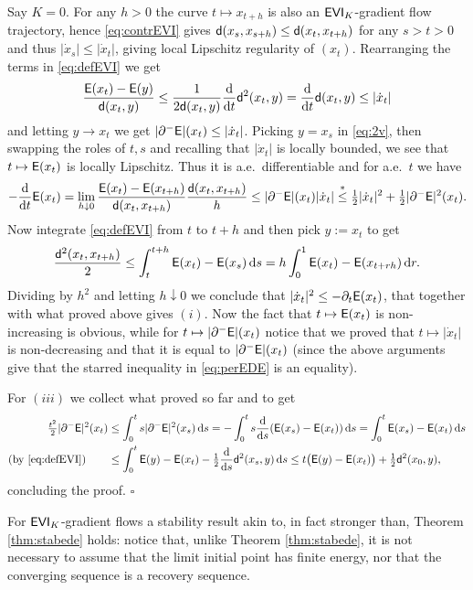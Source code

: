 \documentclass[11pt]{article}
\numberwithin{equation}{section}
\newenvironment{idea}{\removelastskip\par\medskip   %
\noindent{\em Idea of the proof} \rm}{\penalty-20\null\hfill$\square$\par\medbreak}
\newcommand{\sfd}{{\sf d}}
\renewcommand{\d}{{\rm d}}
\newcommand{\E}{{\sf E}} %
\newcommand{\EVI}{{\sf EVI}}
\begin{document}
\begin{idea} Say $K=0$. For any $h>0$ the curve $t\mapsto x_{t+h}$ is also an $\EVI_K$-gradient flow trajectory, hence \eqref{eq:contrEVI} gives $\sfd(x_s,x_{s+h})\leq\sfd(x_t,x_{t+h})$ for any $s>t>0$ and thus $|\dot x_s|\leq |\dot x_t|$, giving local Lipschitz regularity of $(x_t)$. Rearranging the terms in  \eqref{eq:defEVI} we get
\begin{equation}
\label{eq:2v}
\frac{\E(x_t)-\E(y)}{\sfd(x_t,y)}\leq\frac1{2\sfd(x_t,y)}\frac\d{\d t}\sfd^2(x_t,y)=\frac\d{\d t}\sfd(x_t,y)\leq|\dot x_t|
\end{equation}
and letting $y\to x_t$ we get $|\partial^-\E|(x_t)\leq|\dot x_t|$. Picking $y=x_s$ in \eqref{eq:2v}, then swapping the roles of $t,s$ and recalling that $|\dot x_t|$ is locally bounded, we see that $t\mapsto \E(x_t)$ is locally Lipschitz. Thus it is a.e.\ differentiable and for a.e.\ $t$ we have
\begin{equation}
\label{eq:perEDE}
-\frac\d{\d t}\E(x_t)=\lim_{h\downarrow0}\frac{\E(x_t)-\E(x_{t+h})}{\sfd(x_t,x_{t+h})}\frac{\sfd(x_t,x_{t+h})}h\leq |\partial^-\E|(x_t)|\dot x_t|\stackrel*\leq\tfrac12|\dot x_t|^2+\tfrac12|\partial^-\E|^2(x_t).
\end{equation}
Now integrate \eqref{eq:defEVI} from $t$ to $t+h$ and then pick $y:=x_{t}$ to get 
\[
\frac{\sfd^2(x_t,x_{t+h})}2\leq \int_t^{t+h}\E(x_{t})-\E(x_{s})\,\d s=h\int_0^1\E(x_t)-\E(x_{t+rh})\,\d r.
\]
Dividing by $h^2$ and letting $h\downarrow0$ we conclude that $|\dot x_t|^2\leq -\partial_t\E(x_t)$, that together with what proved above gives $(i)$. Now the fact that $ t\mapsto \E(x_t)$ is non-increasing is obvious, while for $ t\mapsto |\partial^-\E|(x_t)$  notice that we proved that  $t\mapsto |\dot x_t|$ is non-decreasing and that it is equal to $|\partial^-\E|(x_t)$ (since the above arguments give that the starred inequality in \eqref{eq:perEDE} is an equality).

For $(iii)$ we collect what proved so far and to get
\[
\begin{split}
\tfrac{t^2}2|\partial^-\E|^2(x_t)&\leq\int_0^ts|\partial^-\E|^2(x_s)\,\d s=-\int_0^ts\frac\d{\d s}(\E(x_s)-\E(x_t))\,\d s=\int_0^t\E(x_s)-\E(x_t)\,\d s\\
\text{(by \eqref{eq:defEVI})}\qquad&\leq \int_0^t\E(y)-\E(x_t)-\tfrac12\frac\d{\d s}\sfd^2(x_s,y)\,\d s\leq t\big(\E(y)-\E(x_t)\big)+\tfrac12\sfd^2(x_0,y),
\end{split}
\]
concluding the proof.
\end{idea}
For $\EVI_K$-gradient flows a stability result akin to, in fact stronger than, Theorem \ref{thm:stabede} holds: notice that, unlike Theorem \ref{thm:stabede}, it is not necessary to assume that the limit initial point has finite energy, nor that the converging sequence is a recovery sequence.
\end{document}
